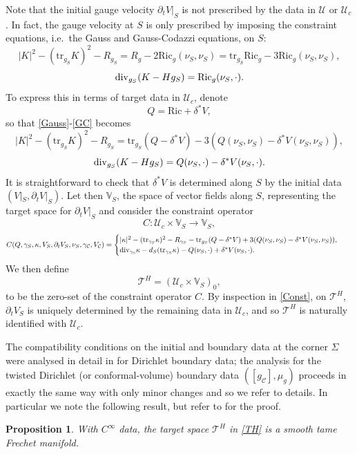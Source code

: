 \documentclass[10pt]{amsart}
\newcommand{\g}{\gamma}
\renewcommand{\d}{\delta}
\newcommand{\Si}{\Sigma}
\renewcommand{\k}{\kappa}
\newcommand{\cC}{{\mathcal C}}
\newcommand{\cT}{{\mathcal T}}
\newcommand{\cU}{{\mathcal U}}
\newcommand{\bV}{\mathbb V}
\newcommand{\Ric}{\mathrm{Ric}}
\newcommand{\be}{\begin{equation}}
\newcommand{\ee}{\end{equation}}
\newcommand{\tr}{\mathrm{tr}}
\newcommand{\p}{\partial}
\renewcommand{\to}{\rightarrow}
\newcommand{\<}{\langle}
\renewcommand{\>}{\rangle}
\theoremstyle{plain}
\newtheorem{proposition}[lemma]{Proposition}
\theoremstyle{remark}
\theoremstyle{definition}
\numberwithin{equation}{section}
\begin{document}
Note that the initial gauge velocity $\p_t V |_S$ is not prescribed by the data in $\cU$ or $\cU_c$. 
In fact, the gauge velocity at $S$ is only prescribed by imposing the constraint equations, i.e.~the Gauss and Gauss-Codazzi equations, 
on $S$: 
\be \label{Gauss}
|K|^2 - (\tr_{g_S}K)^2 - R_{g_S} = R_g - 2\Ric_g(\nu_S,\nu_S) = \tr_{g_S}\Ric_g - 3\Ric_g(\nu_S,\nu_S),
\ee
\be \label{GC} 
{\rm div}_{g_S}(K - Hg_S) = \Ric_g(\nu_S, \cdot). 
\ee 
To express this in terms of target data in $\cU_c$, denote
$$Q = \Ric + \d^*V,$$
so that \eqref{Gauss}-\eqref{GC} becomes 
\be \label{VGauss}
|K|^2 - (\tr_{g_S}K)^2 - R_{g_S} = \tr_{g_S}(Q - \d^*V) - 3(Q(\nu_S, \nu_S) - \d^*V(\nu_S,\nu_S)),
\ee
\be \label{VGC} 
{\rm div}_{g_S}(K - Hg_S) = Q(\nu_S, \cdot) - \d^*V(\nu_S, \cdot). 
\ee 
It is straightforward to check that $\d^*V$ is determined along $S$ by the initial data $(V|_S, \p_t V |_S)$. 
Let then $\bV_S$, the space of vector fields along $S$, representing the target space for $\p_t V |_S$ and consider the constraint operator 
 $$C: \cU_c \times \bV_S \to \bV_S,$$
\be \label{Const}
\begin{split}
& C(Q, \g_S, \k, V_S, \p_t V_S, \nu_S, \g_{\cC}, V_{\cC}) = 
\begin{cases}
|\k|^2 - (\tr_{\g_S}\k)^2  - R_{\g_S} - \tr_{g_S}(Q - \d^*V) + 3(Q(\nu_S, \nu_S) - \d^*V(\nu_S,\nu_S)),\\
{\rm div_{\g_S}}  \k - d_S(\tr_{\g_S}\k) - Q(\nu_S, \cdot) + \d^*V(\nu_S, \cdot). \\
\end{cases}
\end{split}
\ee
We then define 
 \be \label{TH}
 \cT^H = (\cU_c \times \bV_S)_0,
 \ee
to be the zero-set of the constraint operator $C$. By inspection in \eqref{Const}, on $\cT^H$, $\p_t V_S$ is uniquely determined by the remaining 
data in $\cU_c$, and so $\cT^H$ is naturally identified with $\cU_c$. 

The compatibility conditions on the initial and boundary data at the corner $\Si$ were analysed in detail in \cite{I} for Dirichlet boundary data; the 
analysis for the twisted Dirichlet (or conformal-volume) boundary data $([g_{\cC}], \mu_g)$ proceeds in exactly the same way with only minor changes 
and so we refer to \cite{I} details. In particular we note the following result, but refer to \cite{I} for the proof. 

\begin{proposition}\label{manifold}
With $C^{\infty}$ data, the target space $\cT^H$ in \eqref{TH} is a smooth tame Frechet manifold. 
\end{proposition}
\end{document}
